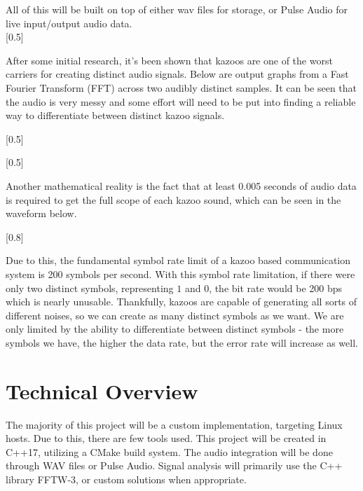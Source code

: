 \documentclass[]{article}
\begin{document}
All of this will be built on top of either wav files for storage, or Pulse Audio for live
input/output audio data. \\

[0.5\textwidth]



After some initial research, it's been shown that kazoos are one of the worst
carriers for creating distinct audio signals. Below are output graphs from a
Fast Fourier Transform (FFT) across two audibly distinct samples. It can be
seen that the audio is very messy and some effort will need to be put into
finding a reliable way to differentiate between distinct kazoo signals.

[0.5\textwidth]

[0.5\textwidth]

Another mathematical reality is the fact that at least 0.005 seconds of audio
data is required to get the full scope of each kazoo sound, which can be seen
in the waveform below.

[0.8\textwidth]

Due to this, the fundamental symbol rate limit of a kazoo based communication
system is 200 symbols per second. With this symbol rate limitation, if there
were only two distinct symbols, representing $1$ and $0$, the bit rate would be
200 bps which is nearly unusable. Thankfully, kazoos are capable of generating
all sorts of different noises, so we can create as many distinct symbols as we
want. We are only limited by the ability to differentiate between distinct symbols - the more symbols we have, the higher the data rate, but the error rate will increase as well. \\

\section{Technical Overview}

The majority of this project will be a custom implementation, targeting Linux hosts. Due
to this, there are few tools used. This project will be created in C++17, utilizing a CMake build system. The audio integration will be done through WAV files or Pulse Audio. Signal analysis will primarily use the C++ library FFTW-3, or custom solutions when appropriate.
\end{document}

